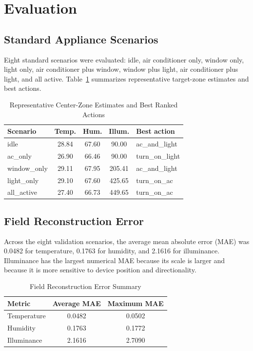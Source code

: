 \documentclass[conference]{IEEEtran}
\begin{document}
\section{Evaluation}
\subsection{Standard Appliance Scenarios}
Eight standard scenarios were evaluated: idle, air conditioner only, window only, light only, air conditioner plus window, window plus light, air conditioner plus light, and all active. Table~\ref{tab:zone} summarizes representative target-zone estimates and best actions.

\begin{table}[t]
\caption{Representative Center-Zone Estimates and Best Ranked Actions}
\label{tab:zone}
\centering
\begin{tabular}{|l|c|c|c|l|}
\hline
Scenario & Temp. & Hum. & Illum. & Best action\\
\hline
idle & 28.84 & 67.60 & 90.00 & ac\_and\_light\\
ac\_only & 26.90 & 66.46 & 90.00 & turn\_on\_light\\
window\_only & 29.11 & 67.95 & 205.41 & ac\_and\_light\\
light\_only & 29.10 & 67.60 & 425.65 & turn\_on\_ac\\
all\_active & 27.40 & 66.73 & 449.65 & turn\_on\_ac\\
\hline
\end{tabular}
\end{table}

\subsection{Field Reconstruction Error}
Across the eight validation scenarios, the average mean absolute error (MAE) was 0.0482 for temperature, 0.1763 for humidity, and 2.1616 for illuminance. Illuminance has the largest numerical MAE because its scale is larger and because it is more sensitive to device position and directionality.

\begin{table}[t]
\caption{Field Reconstruction Error Summary}
\label{tab:mae}
\centering
\begin{tabular}{|l|c|c|}
\hline
Metric & Average MAE & Maximum MAE\\
\hline
Temperature & 0.0482 & 0.0502\\
Humidity & 0.1763 & 0.1772\\
Illuminance & 2.1616 & 2.7090\\
\hline
\end{tabular}
\end{table}
\end{document}
